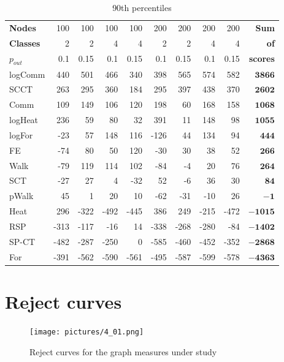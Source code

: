\documentclass{article}
\begin{document}
\begin{table}[H]{\small
	\centering
	\begin{tabular}{lrrrrrrrrr}
		\toprule
\textbf{Nodes}   & 100&  100& 100&  100& 200&  200& 200&  200&{\textbf{Sum}}\\
\textbf{Classes} &   2&    2&   4&    4&   2&    2&   4&    4&{\textbf{  of}}\\
$p_{out}$        & 0.1&	0.15& 0.1& 0.15& 0.1& 0.15& 0.1& 0.15&{\textbf{scores}}\\
		\midrule
logComm & 440 & 501 & 466 & 340 & 398 & 565 & 574 & 582 & $\bm{3866}$\\
SCCT & 263 & 295 & 360 & 184 & 295 & 397 & 438 & 370 & $\bm{2602}$\\
Comm & 109 & 149 & 106 & 120 & 198 & 60 & 168 & 158 & $\bm{1068}$\\
logHeat & 236 & 59 & 80 & 32 & 391 & 11 & 148 & 98 & $\bm{1055}$\\
logFor & -23 & 57 & 148 & 116 & -126 & 44 & 134 & 94 & $\bm{444}$\\
FE & -74 & 80 & 50 & 120 & -30 & 30 & 38 & 52 & $\bm{266}$\\
Walk & -79 & 119 & 114 & 102 & -84 & -4 & 20 & 76 & $\bm{264}$\\
SCT & -27 & 27 & 4 & -32 & 52 & -6 & 36 & 30 & $\bm{84}$\\
pWalk & 45 & 1 & 20 & 10 & -62 & -31 & -10 & 26 &$\bm{-1}$\\
Heat & 296 & -322 & -492 & -445 & 386 & 249 & -215 & -472 & $\bm{-1015}$\\
RSP & -313 & -117 & -16 & 14 & -338 & -268 & -280 & -84 & $\bm{-1402}$\\
SP-CT & -482 & -287 & -250 & 0 & -585 & -460 & -452 & -352 & $\bm{-2868}$\\
For & -391 & -562 & -590 & -561 & -495 & -587 & -599 & -578 & $\bm{-4363}$\\
		\bottomrule
	\end{tabular}
	\caption{\label{t_CopComp} 90th percentiles}
}\end{table}

\newpage
\section{Reject curves}



\begin{figure}[H]
	\texttt{[image: pictures/4\_01.png]}
	\caption{\label{f_4_big} Reject curves for the graph measures under study}
\end{figure}
\end{document}
